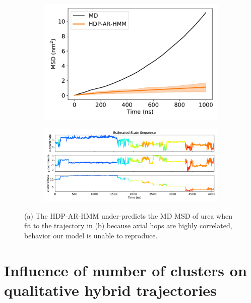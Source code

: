 \documentclass{article}
\begin{document}
  \begin{figure}[h]
  \centering
  \begin{subfigure}{0.35\textwidth}
  \includegraphics[width=\textwidth]{underestimate_URE_13.pdf}
  \caption{}\label{fig:underestimate_msd}
  \end{subfigure}
  \begin{subfigure}{0.63\textwidth}
  \includegraphics[width=\textwidth]{state_sequence_before_URE_13.pdf}
  \caption{}\label{fig:underestimate_traj}
  \end{subfigure}
  \caption{(a) The HDP-AR-HMM under-predicts the MD MSD of urea when fit
  to the trajectory in (b) because axial hops are highly correlated, 
  behavior our model is unable to reproduce.}\label{fig:urea_underestimate}
  \end{figure}
  
  \section{Influence of number of clusters on qualitative hybrid trajectories}\label{section:qualitative}
  
\end{document}
